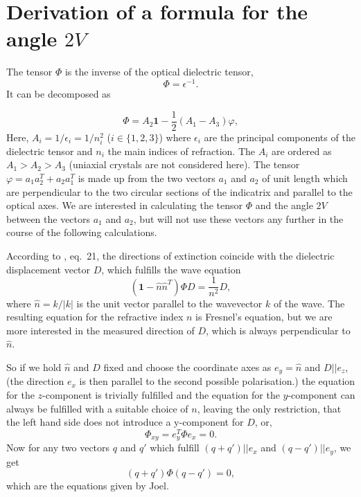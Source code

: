 \documentclass{article}
\begin{document}
\section{Derivation of a formula for the angle $2V$}

The tensor $\Phi$ is the inverse of the optical dielectric tensor,
\[ 
	\Phi=\epsilon^{-1}.
\]
It can be decomposed as

\[
	\Phi=A_2 \mathbf{1} -\frac{1}{2} (A_1-A_3) \varphi,
\]
Here, $A_i=1/\epsilon_i=1/n_i^2$ ($i \in \{1,2,3\}$) where $\epsilon_i$ are the principal components of the dielectric  tensor and $n_i$ the main indices of refraction. 
The $A_i$ are ordered as $A_1>A_2>A_3$ (uniaxial crystals are not considered here).
The tensor $\varphi=a_1a_2^T+a_2a_1^T$ is made up from the two vectors $a_1$ and $a_2$ of unit length which are perpendicular to the two circular sections of the indicatrix and parallel to the optical axes. 
We are interested in calculating  the tensor $\Phi$ and the angle $2V$ between the vectors $a_1$ and $a_2$, but will not use these vectors any further in the course of the following calculations. 


According to \cite{landau2013electrodynamics}, eq.\ 21, the directions of extinction coincide with the dielectric displacement vector $D$, which fulfills the wave equation
\begin{equation}
	\label{eq:wave}
	(\mathbf{1}-\hat{n}\hat{n}^T)\Phi D =\frac{1}{n^2}D,
\end{equation}
where $\hat{n}=k/|k|$ is the unit vector parallel to the wavevector $k$  of the wave. 
The resulting equation for the refractive index $n$ is Fresnel's equation, but we are more interested in the measured direction of 
$D$, which is always perpendicular to $\hat{n}$. 


So if we hold $\hat{n}$ and $D$ fixed and choose the coordinate axes as $e_y=\hat{n}$ and $D || e_z$, (the direction $e_x$ is then parallel to the second possible polarisation.) the equation for the $z$-component is trivially fulfilled and the equation for the $y$-component can always be fulfilled with a suitable choice of $n$, leaving the only restriction, that the left hand side does not introduce a y-component for $D$, or,
\begin{equation}
	\label{eq:Phixy}
	\Phi_{xy}=e_y^T\Phi e_x=0.
\end{equation}
Now for any two vectors $q$ and $q'$ which fulfill $(q+q')|| e_x$ and $(q-q')||e_y$, we get
\[
	(q+q')\Phi(q-q')=0,
\]
which are the equations given by Joel. 
\end{document}
